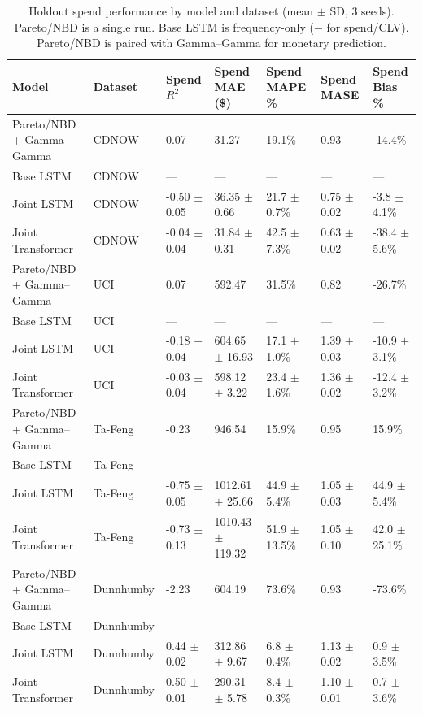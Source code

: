 \begin{table}
\centering
\small
\caption{Holdout spend performance by model and dataset (mean $\pm$ SD, 3 seeds). Pareto/NBD is a single run. Base LSTM is frequency-only ($-$ for spend/CLV). Pareto/NBD is paired with Gamma--Gamma for monetary prediction.}
\label{tab:headline_summary_spend}
\begin{tabular}{lllllll}
\toprule
Model & Dataset & Spend $R^2$ & Spend MAE (\$) & Spend MAPE \% & Spend MASE & Spend Bias \% \\
\midrule
Pareto/NBD + Gamma--Gamma & CDNOW & 0.07 & 31.27 & 19.1\% & 0.93 & -14.4\% \\
Base LSTM & CDNOW & — & — & — & — & — \\
Joint LSTM & CDNOW & -0.50 $\pm$ 0.05 & 36.35 $\pm$ 0.66 & 21.7 $\pm$ 0.7\% & 0.75 $\pm$ 0.02 & -3.8 $\pm$ 4.1\% \\
Joint Transformer & CDNOW & -0.04 $\pm$ 0.04 & 31.84 $\pm$ 0.31 & 42.5 $\pm$ 7.3\% & 0.63 $\pm$ 0.02 & -38.4 $\pm$ 5.6\% \\
Pareto/NBD + Gamma--Gamma & UCI & 0.07 & 592.47 & 31.5\% & 0.82 & -26.7\% \\
Base LSTM & UCI & — & — & — & — & — \\
Joint LSTM & UCI & -0.18 $\pm$ 0.04 & 604.65 $\pm$ 16.93 & 17.1 $\pm$ 1.0\% & 1.39 $\pm$ 0.03 & -10.9 $\pm$ 3.1\% \\
Joint Transformer & UCI & -0.03 $\pm$ 0.04 & 598.12 $\pm$ 3.22 & 23.4 $\pm$ 1.6\% & 1.36 $\pm$ 0.02 & -12.4 $\pm$ 3.2\% \\
Pareto/NBD + Gamma--Gamma & Ta-Feng & -0.23 & 946.54 & 15.9\% & 0.95 & 15.9\% \\
Base LSTM & Ta-Feng & — & — & — & — & — \\
Joint LSTM & Ta-Feng & -0.75 $\pm$ 0.05 & 1012.61 $\pm$ 25.66 & 44.9 $\pm$ 5.4\% & 1.05 $\pm$ 0.03 & 44.9 $\pm$ 5.4\% \\
Joint Transformer & Ta-Feng & -0.73 $\pm$ 0.13 & 1010.43 $\pm$ 119.32 & 51.9 $\pm$ 13.5\% & 1.05 $\pm$ 0.10 & 42.0 $\pm$ 25.1\% \\
Pareto/NBD + Gamma--Gamma & Dunnhumby & -2.23 & 604.19 & 73.6\% & 0.93 & -73.6\% \\
Base LSTM & Dunnhumby & — & — & — & — & — \\
Joint LSTM & Dunnhumby & 0.44 $\pm$ 0.02 & 312.86 $\pm$ 9.67 & 6.8 $\pm$ 0.4\% & 1.13 $\pm$ 0.02 & 0.9 $\pm$ 3.5\% \\
Joint Transformer & Dunnhumby & 0.50 $\pm$ 0.01 & 290.31 $\pm$ 5.78 & 8.4 $\pm$ 0.3\% & 1.10 $\pm$ 0.01 & 0.7 $\pm$ 3.6\% \\
\bottomrule
\end{tabular}
\end{table}
